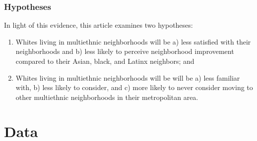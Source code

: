 \documentclass[]{article}
\providecommand{\tightlist}{%
  \setlength{\itemsep}{0pt}\setlength{\parskip}{0pt}}
\theoremstyle{definition}
\theoremstyle{definition}
\theoremstyle{definition}
\theoremstyle{remark}
\begin{document}
\subsubsection{Hypotheses}\label{hypotheses}

In light of this evidence, this article examines two hypotheses:

\begin{enumerate}
\def\labelenumi{\arabic{enumi}.}
\tightlist
\item
  Whites living in multiethnic neighborhoods will be a) less satisfied
  with their neighborhoods and b) less likely to perceive neighborhood
  improvement compared to their Asian, black, and Latinx neighbors; and
\item
  Whites living in multiethnic neighborhoods will be will be a) less
  familiar with, b) less likely to consider, and c) more likely to never
  consider moving to other multiethnic neighborhoods in their
  metropolitan area.
\end{enumerate}

\singlespacing
\section{Data}\label{data}
\end{document}
